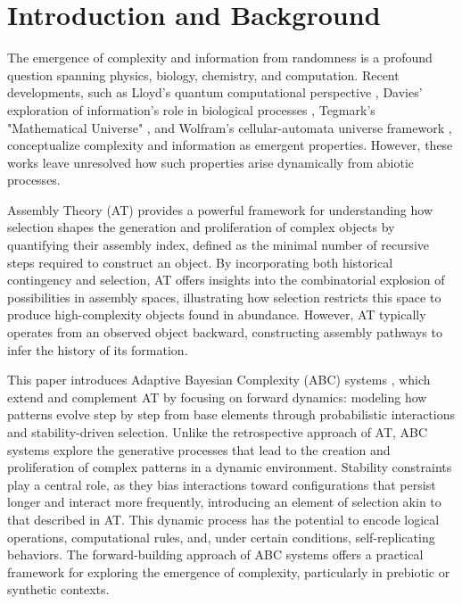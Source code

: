 \documentclass[entropy,article,submit,pdftex,oneauthor]{Definitions/mdpi}
\begin{document}
\section{Introduction and Background}

The emergence of complexity and information from randomness is a profound question spanning physics, biology, chemistry, and computation. Recent developments, such as Lloyd's quantum computational perspective \cite{lloyd2006programming}, Davies' exploration of information's role in biological processes \cite{davies2019demon}, Tegmark's "Mathematical Universe" \cite{tegmark2008mathematical}, and Wolfram's cellular-automata universe framework \cite{wolfram2020fundamental}, conceptualize complexity and information as emergent properties. However, these works leave unresolved how such properties arise dynamically from abiotic processes.

Assembly Theory (AT) \cite{walker2023nature} provides a powerful framework for understanding how selection shapes the generation and proliferation of complex objects by quantifying their assembly index, defined as the minimal number of recursive steps required to construct an object. By incorporating both historical contingency and selection, AT offers insights into the combinatorial explosion of possibilities in assembly spaces, illustrating how selection restricts this space to produce high-complexity objects found in abundance. However, AT typically operates from an observed object backward, constructing assembly pathways to infer the history of its formation.

This paper introduces Adaptive Bayesian Complexity (ABC) systems \cite{adler2024howinfoevolves}, which extend and complement AT by focusing on forward dynamics: modeling how patterns evolve step by step from base elements through probabilistic interactions and stability-driven selection. Unlike the retrospective approach of AT, ABC systems explore the generative processes that lead to the creation and proliferation of complex patterns in a dynamic environment. Stability constraints play a central role, as they bias interactions toward configurations that persist longer and interact more frequently, introducing an element of selection akin to that described in AT. This dynamic process has the potential to encode logical operations, computational rules, and, under certain conditions, self-replicating behaviors. The forward-building approach of ABC systems offers a practical framework for exploring the emergence of complexity, particularly in prebiotic or synthetic contexts.
\end{document}
